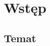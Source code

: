 \documentclass{book}
\begin{document}
	

\kslistofremarks

\cleardoublepage

	
\mainmatter %
	
	\chapter{Wstęp}
		\section{Temat}
	
\end{document}
